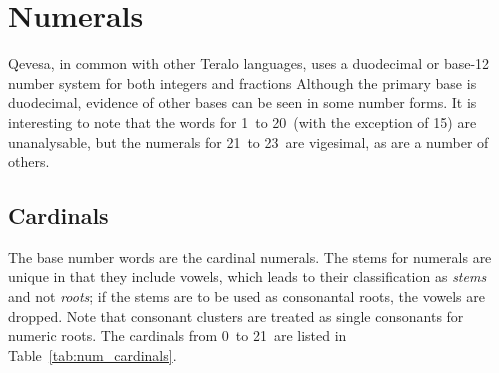 \documentclass[grammar]{subfiles}
\begin{document}
  \chapter{Numerals}
  \label{ch:numerals}

  Qevesa, in common with other Teralo languages, uses a duodecimal or base-12 number system for both integers and fractions Although the primary base is duodecimal, evidence of other bases can be seen in some number forms. It is interesting to note that the words for 1\dec\ to 20\dec\ (with the exception of 15\dec) are unanalysable, but the numerals for 21\dec\ to 23\dec\ are vigesimal\footnotemark{}, as are a number of others.

  \section{Cardinals}
  \label{sec:num_cardinals}

  The base number words are the cardinal numerals. The stems for numerals are unique in that they include vowels, which leads to their classification as \emph{stems} and not \emph{roots}; if the stems are to be used as consonantal roots, the vowels are dropped. Note that consonant clusters are treated as single consonants for numeric roots. The cardinals from 0\dec\ to 21\dec\ are listed in Table~\ref{tab:num_cardinals}.
\end{document}
